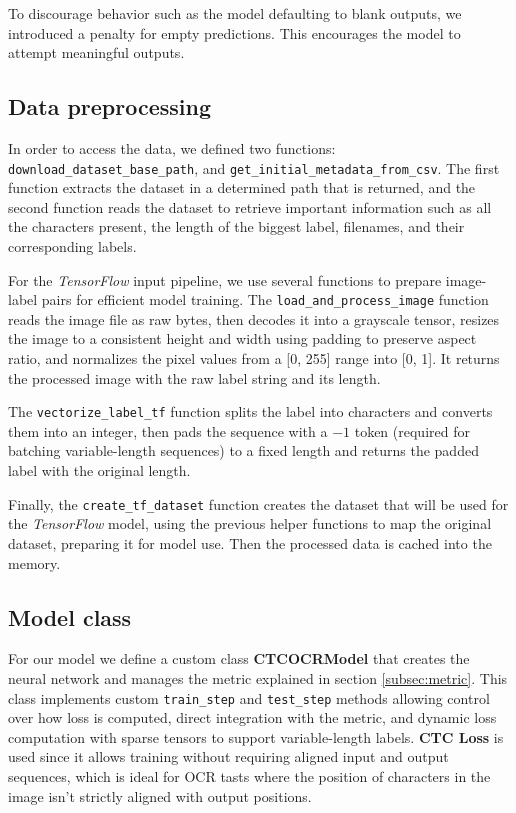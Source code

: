 \documentclass[11pt,letterpaper]{article}
\begin{document}
	To discourage behavior such as the model defaulting to blank outputs, we introduced a penalty for empty predictions. This encourages the model to attempt meaningful outputs.
	
	\subsection{Data preprocessing}
	In order to access the data, we defined two functions: \texttt{download\_dataset\_base\_path}, and \texttt{get\_initial\-\_metadata\_from\_csv}. The first function extracts the dataset in a determined path that is returned, and the second function reads the dataset to retrieve important information such as all the characters present, the length of the biggest label, filenames, and their corresponding labels.
	
	For the \textit{TensorFlow} input pipeline, we use several functions to prepare image-label pairs for efficient model training. The \texttt{load\_and\_process\_image} function reads the image file as raw bytes, then decodes it into a grayscale tensor, resizes the image to a consistent height and width using padding to preserve aspect ratio, and normalizes the pixel values from a [0, 255] range into [0, 1]. It returns the processed image with the raw label string and its length. 
	
	The \texttt{vectorize\_label\_tf} function splits the label into characters and converts them into an integer, then pads the sequence with a $-1$ token (required for batching variable-length sequences) to a fixed length and returns the padded label with the original length.
	
	Finally, the \texttt{create\_tf\_dataset} function creates the dataset that will be used for the \textit{TensorFlow} model, using the previous helper functions to map the original dataset, preparing it for model use. Then the processed data is cached into the memory.
	
	\subsection{Model class} \label{subsec:model_class}
	For our model we define a custom class \textbf{CTCOCRModel} that creates the neural network and manages the metric explained in section \ref{subsec:metric}. This class implements custom \texttt{train\_step} and \texttt{test\_step} methods allowing control over how loss is computed, direct integration with the metric, and dynamic loss computation with sparse tensors to support variable-length labels. \textbf{CTC Loss} is used since it allows training without requiring aligned input and output sequences, which is ideal for OCR tasts where the position of characters in the image isn't strictly aligned with output positions.
	
\end{document}

